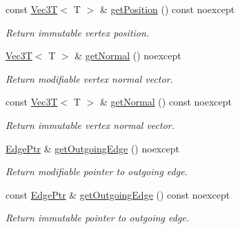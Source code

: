\begin{DoxyCompactItemize}
\mbox{\label{classDcel_1_1VertexT_a7a4c3e499c6f7e529cc556eecf94f3fe}} 
const \hyperlink{classVec3T}{Vec3T}$<$ T $>$ \& \hyperlink{classDcel_1_1VertexT_a7a4c3e499c6f7e529cc556eecf94f3fe}{get\+Position} () const noexcept
\begin{DoxyCompactList}\small\item\em Return immutable vertex position. \end{DoxyCompactList}\item 
\mbox{\label{classDcel_1_1VertexT_a11d1c90ccfa44b5ea121223bd86214c9}} 
\hyperlink{classVec3T}{Vec3T}$<$ T $>$ \& \hyperlink{classDcel_1_1VertexT_a11d1c90ccfa44b5ea121223bd86214c9}{get\+Normal} () noexcept
\begin{DoxyCompactList}\small\item\em Return modifiable vertex normal vector. \end{DoxyCompactList}\item 
\mbox{\label{classDcel_1_1VertexT_a6d2d15dff96e192dff0254d40e1927b7}} 
const \hyperlink{classVec3T}{Vec3T}$<$ T $>$ \& \hyperlink{classDcel_1_1VertexT_a6d2d15dff96e192dff0254d40e1927b7}{get\+Normal} () const noexcept
\begin{DoxyCompactList}\small\item\em Return immutable vertex normal vector. \end{DoxyCompactList}\item 
\mbox{\label{classDcel_1_1VertexT_ae310f38b6e5b9bb4bae4633117a26708}} 
\hyperlink{classDcel_1_1VertexT_a7c049a24ac43b9750578e4f4ed543831}{Edge\+Ptr} \& \hyperlink{classDcel_1_1VertexT_ae310f38b6e5b9bb4bae4633117a26708}{get\+Outgoing\+Edge} () noexcept
\begin{DoxyCompactList}\small\item\em Return modifiable pointer to outgoing edge. \end{DoxyCompactList}\item 
\mbox{\label{classDcel_1_1VertexT_ab726cf7028c0b9de7eaff211d9ca34aa}} 
const \hyperlink{classDcel_1_1VertexT_a7c049a24ac43b9750578e4f4ed543831}{Edge\+Ptr} \& \hyperlink{classDcel_1_1VertexT_ab726cf7028c0b9de7eaff211d9ca34aa}{get\+Outgoing\+Edge} () const noexcept
\begin{DoxyCompactList}\small\item\em Return immutable pointer to outgoing edge. \end{DoxyCompactList}\item 

\end{DoxyCompactItemize}
